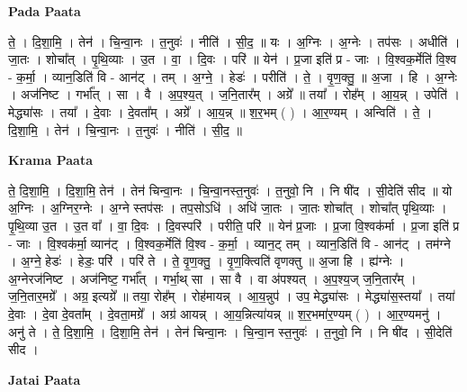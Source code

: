 \documentclass[17pt]{extarticle}
\begin{document}
\textbf{Pada Paata} \newline

ते॒ । दि॒शा॒मि॒ । तेन॑ । चि॒न्वा॒नः । त॒नुवः॑ । नीति॑ । सी॒द॒ ॥ यः । अ॒ग्निः । अ॒ग्नेः । तप॑सः । अधीति॑ । जा॒तः । शोचा᳚त् । पृ॒थि॒व्याः । उ॒त । वा॒ । दि॒वः । परि॑ ॥ येन॑ । प्र॒जा इति॑ प्र - जाः । वि॒श्वक॒र्मेति॑ वि॒श्व - क॒र्मा॒ । व्यान॒डिति॑ वि - आन॑ट् । तम् । अ॒ग्ने॒ । हेडः॑ । परीति॑ । ते॒ । वृ॒ण॒क्तु॒ ॥ अ॒जा । हि । अ॒ग्नेः । अज॑निष्ट । गर्भा᳚त् । सा । वै । अ॒प॒श्य॒त् । ज॒नि॒तार᳚म् । अग्रे᳚ ॥ तया᳚ । रोह᳚म् । आ॒य॒न्न् । उपेति॑ । मेद्ध्या॑सः । तया᳚ । दे॒वाः । दे॒वता᳚म् । अग्रे᳚ । आ॒य॒न्न् ॥ श॒र॒भम् ( ) । आ॒र॒ण्यम् । अन्विति॑ । ते॒ । दि॒शा॒मि॒ । तेन॑ । चि॒न्वा॒नः । त॒नुवः॑ । नीति॑ । सी॒द॒ ॥  \newline


\textbf{Krama Paata} \newline

ते॒ दि॒शा॒मि॒ । दि॒शा॒मि॒ तेन॑ । तेन॑ चिन्वा॒नः । चि॒न्वा॒नस्त॒नुवः॑ । त॒नुवो॒ नि । नि षी॑द । सी॒देति॑ सीद ॥ यो अ॒ग्निः । अ॒ग्निर॒ग्नेः । अ॒ग्ने स्तप॑सः । तप॒सोऽधि॑ । अधि॑ जा॒तः । जा॒तः शोचा᳚त् । शोचा᳚त् पृथि॒व्याः । पृ॒थि॒व्या उ॒त । उ॒त वा᳚ । वा॒ दि॒वः । दि॒वस्परि॑ । परीति॒ परि॑ ॥ येन॑ प्र॒जाः । प्र॒जा वि॒श्वक॑र्मा । प्र॒जा इति॑ प्र - जाः । वि॒श्वक॑र्मा॒ व्यान॑ट् । वि॒श्वक॒र्मेति॑ वि॒श्व - क॒र्मा॒ । व्यान॒ट् तम् । व्यान॒डिति॑ वि - आन॑ट् । तम॑ग्ने । अ॒ग्ने॒ हेडः॑ । हेडः॒ परि॑ । परि॑ ते । ते॒ वृ॒ण॒क्तु॒ । वृ॒ण॒क्त्विति॑ वृणक्तु ॥ अ॒जा हि । ह्य॑ग्नेः । अ॒ग्नेरज॑निष्ट । अज॑निष्ट॒ गर्भा᳚त् । गर्भा॒थ् सा । सा वै । वा अ॑पश्यत् । अ॒प॒श्य॒ज् ज॒नि॒तार᳚म् । ज॒नि॒तार॒मग्रे᳚ । अग्र॒ इत्यग्रे᳚ ॥ तया॒ रोह᳚म् । रोह॑मायन्न् । आ॒य॒न्नुप॑ । उप॒ मेद्ध्या॑सः । मेद्ध्या॑स॒स्तया᳚ । तया॑ दे॒वाः । दे॒वा दे॒वता᳚म् । दे॒वता॒मग्रे᳚ । अग्र॑ आयन्न् । आ॒य॒न्नित्या॑यन्न् ॥ श॒र॒भमा॑र॒ण्यम् ( ) । आ॒र॒ण्यमनु॑ । अनु॑ ते । ते॒ दि॒शा॒मि॒ । दि॒शा॒मि॒ तेन॑ । तेन॑ चिन्वा॒नः । चि॒न्वा॒न स्त॒नुवः॑ । त॒नुवो॒ नि । नि षी॑द । सी॒देति॑ सीद । \newline

\textbf{Jatai Paata} \newline
\end{document}
